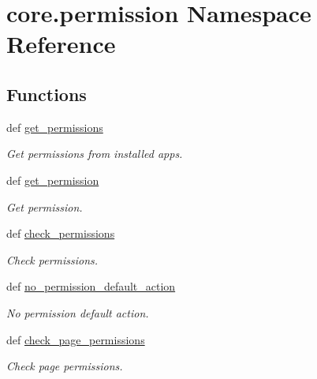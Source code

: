 \hypertarget{namespacecore_1_1permission}{\section{core.\-permission Namespace Reference}
\label{namespacecore_1_1permission}
}
\subsection*{Functions}
\begin{DoxyCompactItemize}
\item 
def \hyperlink{namespacecore_1_1permission_a80240625c439362ef7d4965feffa9371}{get\-\_\-permissions}
\begin{DoxyCompactList}\small\item\em Get permissions from installed apps. \end{DoxyCompactList}\item 
def \hyperlink{namespacecore_1_1permission_af2c48f6db903ff8338f7afef69ba63d5}{get\-\_\-permission}
\begin{DoxyCompactList}\small\item\em Get permission. \end{DoxyCompactList}\item 
def \hyperlink{namespacecore_1_1permission_a992d39a9fe2554e92bdb8fe0eb02418f}{check\-\_\-permissions}
\begin{DoxyCompactList}\small\item\em Check permissions. \end{DoxyCompactList}\item 
def \hyperlink{namespacecore_1_1permission_a260b491a09dab66d6d57245fc3270d26}{no\-\_\-permission\-\_\-default\-\_\-action}
\begin{DoxyCompactList}\small\item\em No permission default action. \end{DoxyCompactList}\item 
def \hyperlink{namespacecore_1_1permission_a2cdd74eb6f0e9c0bdc56836826862227}{check\-\_\-page\-\_\-permissions}
\begin{DoxyCompactList}\small\item\em Check page permissions. \end{DoxyCompactList}\end{DoxyCompactItemize}


